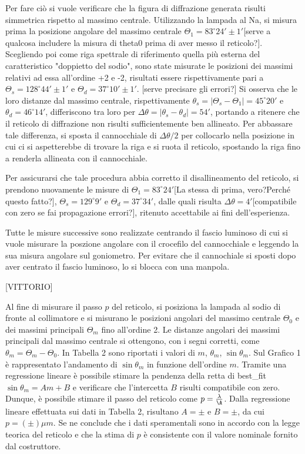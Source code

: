 \documentclass{article}
\begin{document}
Per fare ciò si vuole verificare che la figura di diffrazione generata risulti simmetrica rispetto al massimo centrale.
Utilizzando la lampada al Na, si misura prima la posizione angolare del massimo centrale $\Theta_1 = 83^\circ 24' \pm 1'$[serve a qualcosa includere la misura di theta0 prima di aver messo il reticolo?].
Scegliendo poi come riga spettrale di riferimento quella più esterna del caratteristico "doppietto del sodio", sono state misurate le posizioni dei massimi relativi ad essa all'ordine +2 e -2, risultati essere rispettivamente pari a $\Theta_s = 128^\circ 44' \pm 1'$ e $\Theta_d = 37^\circ 10' \pm 1'$. [serve precisare gli errori?]
Si osserva che le loro distanze dal massimo centrale, rispettivamente $\theta_s = |\Theta_s - \Theta_1| = 45^\circ20'$ e $\theta_d = 46^\circ 14'$, differiscono tra loro per $\Delta\theta = |\theta_s - \theta_d| = 54'$, portando a ritenere che il reticolo di diffrazione non risulti sufficientemente ben allineato.
Per abbassare tale differenza, si sposta il cannocchiale di $\Delta\theta/2$ per collocarlo nella posizione in cui ci si aspetterebbe di trovare la riga e si ruota il reticolo, spostando la riga fino a renderla allineata con il cannocchiale.

Per assicurarsi che tale procedura abbia corretto il disallineamento del reticolo, si prendono nuovamente le misure di $\Theta_1 = 83^\circ 24'$[La stessa di prima, vero?Perché questo fatto?], $\Theta_s = 129^\circ 9'$ e $\Theta_d = 37^\circ 34'$, dalle quali risulta $\Delta\theta = 4'$[compatibile con zero se fai propagazione errori?], ritenuto accettabile ai fini dell'esperienza. 

Tutte le misure successive sono realizzate centrando il fascio luminoso di cui si vuole misurare la poszione angolare con il crocefilo del cannocchiale e leggendo la sua misura angolare sul goniometro. Per evitare che il cannochiale si sposti dopo aver centrato il fascio luminoso, lo si blocca con una manpola.

[VITTORIO]

Al fine di misurare il passo $p$ del reticolo, si posiziona la lampada al sodio di fronte al collimatore e si misurano le posizioni angolari del massimo centrale $\Theta_0$ e dei massimi principali $\Theta_m$ fino all'ordine 2. Le distanze angolari dei massimi principali dal massimo centrale si ottengono, con i segni corretti, come $\theta_m = \Theta_m - \Theta_0$. In Tabella 2 sono riportati i valori di $m$, $\theta_m$, $\sin \theta_m$. Sul Grafico 1 è rappresentato l'andamento di $\sin \theta_m$ in funzione dell'ordine $m$. Tramite una regressione lineare è possibile stimare la pendenza della retta di best_fit $\sin \theta_m = Am + B$ e verificare che l'intercetta $B$ risulti compatibile con zero. Dunque, è possibile stimare il passo del reticolo come $p=\frac{\lambda}{\A}$. Dalla regressione lineare effettuata sui dati in Tabella 2, risultano $A=\pm$ e $B=\pm$, da cui $p=(\pm)\mu m$. Se ne conclude che i dati speramentali sono in accordo con la legge teorica del reticolo e che la stima di $p$ è consistente con il valore nominale fornito dal costruttore.
\end{document}
